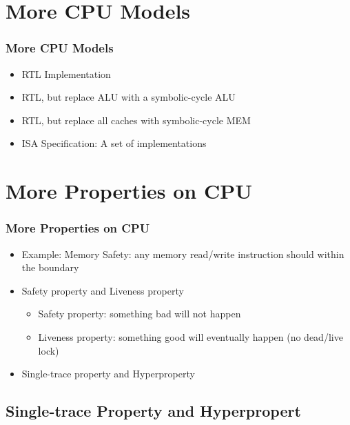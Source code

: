 \documentclass{beamer}
\begin{document}
\section{More CPU Models}

\begin{frame}
\frametitle{More CPU Models}
\begin{itemize}
  \item<1-> RTL Implementation
  \item<2-> RTL, but replace ALU with a symbolic-cycle ALU
  \item<2-> RTL, but replace all caches with symbolic-cycle MEM
  \item<1-> ISA Specification: A set of implementations
\end{itemize}
\end{frame}



\section{More Properties on CPU}

\begin{frame}
\frametitle{More Properties on CPU}
\begin{itemize}
  \item<1-> Example: Memory Safety: any memory read/write instruction should within the boundary
  \item<2-> Safety property and Liveness property
  \begin{itemize}
    \item<3-> Safety property: something bad will not happen
    \item<3-> Liveness property: something good will eventually happen (no dead/live lock)
  \end{itemize}
  \item<4-> Single-trace property and Hyperproperty
\end{itemize}
\end{frame}



\subsection{Single-trace Property and Hyperpropert}
\end{document}
